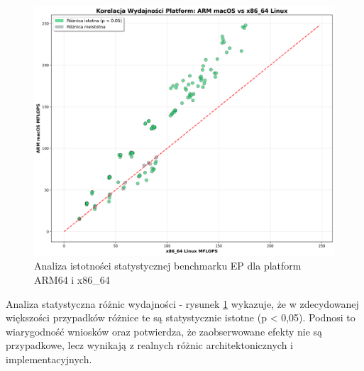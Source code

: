\begin{figure}[H]
    \centering
    \includegraphics[width=\textwidth]{analiza/images/parallel/ep/compare/ep_analiza_istotnosci_statystycznej.png}
    \caption{Analiza istotności statystycznej benchmarku EP dla platform ARM64 i x86\_64}
    \label{ep_analiza_istotnosci_statystycznej}
\end{figure}
Analiza statystyczna różnic wydajności - rysunek \ref{ep_analiza_istotnosci_statystycznej} wykazuje, że w zdecydowanej większości przypadków różnice te są statystycznie istotne (p < 0,05). Podnosi to wiarygodność wniosków oraz potwierdza, że zaobserwowane efekty nie są przypadkowe, lecz wynikają z realnych różnic architektonicznych i implementacyjnych.
